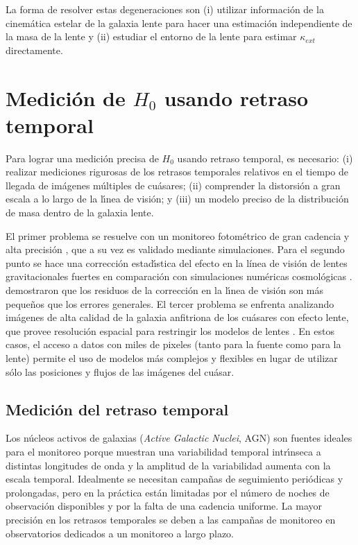 \documentclass[baaa]{baaa}
\begin{document}
La forma de resolver estas degeneraciones son (i) utilizar informaci\'on de la cinem\'atica estelar de la galaxia lente \citep[e.g.][]{treu2002} para hacer una estimaci\'on independiente de la masa de la lente y (ii) estudiar el entorno de la lente \citep[e.g.][]{keeton2004}  para estimar $\kappa_{ext}$ directamente.



\section{Medici\'on de $H_0$ usando retraso temporal} 

Para lograr una medici\'on precisa de $H_0$ usando retraso temporal, es necesario: (i)  realizar mediciones rigurosas de los retrasos temporales relativos en el tiempo de llegada de im\'agenes m\'ultiples de cu\'asares; (ii) comprender la distorsi\'on a gran escala  a lo largo de la l\'{\i}nea de visi\'on; y (iii) un modelo preciso de la distribuci\'on de masa dentro de la galaxia lente.

El primer problema se resuelve con un monitoreo fotom\'etrico de gran cadencia y alta precisión \citep[e.g.][]{courbin2018}, que a su vez es validado mediante simulaciones.  
Para el segundo punto se hace una correcci\'on estad\'{\i}stica del efecto en la línea de visión de lentes gravitacionales fuertes en comparaci\'on con simulaciones num\'ericas cosmol\'ogicas \citep[e.g.][]{suyu2013}. \cite{millon2020} demostraron que los residuos de la correcci\'on en la l\'{\i}nea de visi\'on son m\'as peque\~nos que los errores generales. 
El tercer problema se enfrenta analizando im\'agenes de alta calidad de la galaxia anfitriona de los cu\'asares con efecto lente, que provee resoluci\'on espacial para restringir los modelos de lentes \citep[e.g.][]{suyu2009}.  En estos casos, el acceso a datos con miles de pixeles (tanto para la fuente como para la lente) permite el uso de modelos m\'as complejos y flexibles en lugar de utilizar s\'olo las posiciones y flujos de las im\'agenes del cu\'asar.  


\subsection{Medici\'on del retraso temporal} \label{S_curvaluz}

Los n\'ucleos activos de galaxias ({\em Active Galactic Nuclei}, AGN) son fuentes ideales para el monitoreo porque muestran una variabilidad temporal intr\'{\i}nseca a distintas longitudes de onda y la amplitud de la variabilidad aumenta con la escala temporal. Idealmente se necesitan campa\~nas de seguimiento peri\'odicas y prolongadas, pero en la práctica est\'an limitadas por el n\'umero de noches de observaci\'on disponibles y por la falta de una cadencia uniforme.  La mayor precisi\'on en los retrasos temporales se deben a las campañas de monitoreo en observatorios dedicados a un monitoreo a largo plazo. 
\end{document}
